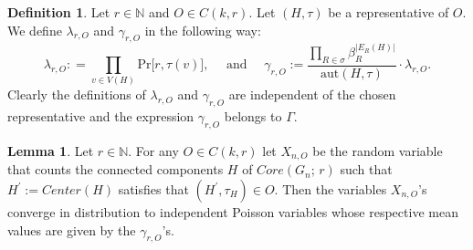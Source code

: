 \documentclass[12pt,notitlepage,a4paper]{article}
\theoremstyle{definition}
\newtheorem{lemma}{Lemma}[section]
\newtheorem{definition}{Definition}[section]
\newcommand{\N}{\mathbb{N}}
\newcommand{\aut}{\mathrm{aut}}
\begin{document}
\begin{definition} Let $r\in \N$ and $O\in C(k,r)$.
	Let $(H,\tau)$ be
	a representative of $O$.
	We define $\lambda_{r,O}$ and 
	$\gamma_{r,O}$ in the following way:
	\[ 
	\lambda_{r,O}:
	=\prod_{v\in V(H)}
	\mathrm{Pr} \big[ r, \tau(v) \big],
	\quad 
	\text{ and } \quad
	\gamma_{r,O}:=
	\frac{\prod_{R\in \sigma} \beta_R^{|E_R(H)|}}
	{\aut(H,\tau)}\cdot\lambda_{r,O}.
	\]	
	Clearly the definitions of $\lambda_{r,O}$ and $\gamma_{r,O}$
	are independent of the chosen representative and
	the expression $\gamma_{r,O}$ belongs to $\Gamma$.
\end{definition}

\begin{lemma}
	Let $r\in \N$. For any $O\in C(k,r)$ let $X_{n,O}$ be
	the random variable that counts the connected components
	$H$ of $Core(G_n;\, r)$ such that $H^\prime:=Center(H)$
	satisfies that $(H^\prime, \tau_{H})\in O$. Then the variables
	$X_{n,O}$'s converge in distribution to independent 
	Poisson variables whose respective mean values are given by the 
	$\gamma_{r,O}$'s.
\end{lemma}
\end{document}
